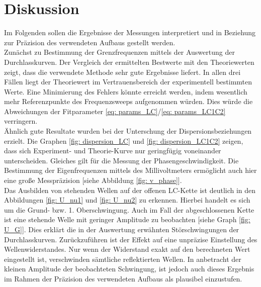 \section{Diskussion}
Im Folgenden sollen die Ergebnisse der Messungen interpretiert und in Beziehung zur Präzision des verwendeten Aufbaus gestellt werden. \\
Zunächst zu Bestimmung der Grenzfrequenzen mittels der Auswertung der Durchlasskurven. Der Vergleich
der ermittelten Bestwerte mit den Theoriewerten zeigt, dass die verwendete Methode sehr gute Ergebnisse liefert.
In allen drei Fällen liegt der Theoriewert im Vertrauensbereich der experimentell bestimmten Werte. Eine Minimierung
des Fehlers könnte erreicht werden, indem wesentlich mehr Referenzpunkte des Frequenzsweeps aufgenommen würden. Dies würde
die Abweichungen der Fitparameter \eqref{eq: params_LC}/\eqref{eq: params_LC1C2} verringern. \\
Ähnlich gute Resultate wurden bei der Unterschung der Dispersionsbeziehungen erzielt. Die Graphen \ref{fig: dispersion_LC} und \ref{fig: dispersion_LC1C2}
zeigen, dass sich Experiment- und Theorie-Kurve nur geringfügig voneinander unterscheiden. Gleiches gilt
für die Messung der Phasengeschwindigkeit. Die Bestimmung der Eigenfrequenzen mittels des Millivoltmeters ermöglicht
auch hier eine große Messpräzision [siehe Abbildung \ref{fig: v_phase}].\\
Das Ausbilden von stehenden Wellen auf der offenen LC-Kette ist deutlich in den Abbildungen \ref{fig: U_nu1} und \ref{fig: U_nu2}
zu erkennen. Hierbei handelt es sich um die Grund- bzw. 1. Oberschwingung. Auch im Fall
der abgeschlossenen Kette ist eine stehende Welle mit geringer Amplitude zu beobachten [siehe Graph \ref{fig: U_G}]. Dies erklärt
die in der Auswertung erwähnten Störschwingungen der Durchlasskurven. Zurückzuführen ist der Effekt auf eine unpräzise
Einstellung des Wellenwiderstandes. Nur wenn der Widerstand exakt auf den berechneten
Wert eingestellt ist, verschwinden sämtliche reflektierten Wellen. In anbetracht der kleinen Amplitude der beobachteten
Schwingung, ist jedoch auch dieses Ergebnis im Rahmen der Präzision des verwendeten Aufbaus als plausibel einzustufen.
